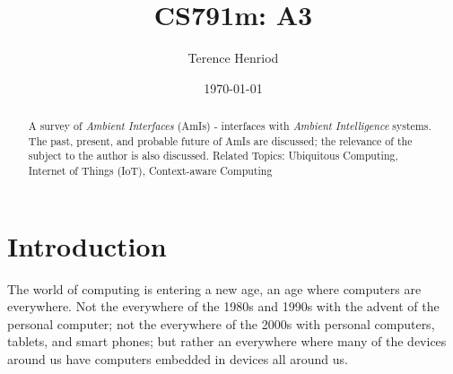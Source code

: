 \documentclass{article}
\title{CS791m: A3}
\author{Terence Henriod}
\date{\today}
\begin{document}
\clearpage            %
\maketitle            %
\thispagestyle{empty} %

\begin{abstract}
A survey of \emph{Ambient Interfaces} (AmIs) - interfaces with \emph{Ambient Intelligence} systems. The past, present, and probable future of AmIs are discussed; the relevance of the subject to the author is also discussed. Related Topics: Ubiquitous Computing, Internet of Things (IoT), Context-aware Computing
\end{abstract}

\newpage
\section{Introduction}
The world of computing is entering a new age, an age where computers are everywhere. Not the everywhere of the 1980s and 1990s with the advent of the personal computer; not the everywhere of the 2000s with personal computers, tablets, and smart phones; but rather an everywhere where many of the devices around us have computers embedded in devices all around us.
\end{document}
